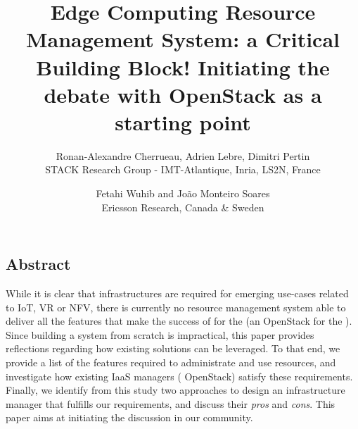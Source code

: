 \documentclass[letterpaper,twocolumn,10pt]{article}
\begin{document}
\date{}

\title{\Large \bf Edge Computing Resource Management System: a Critical
Building Block! Initiating the debate with OpenStack as a starting point}

\author{
{\rm Ronan-Alexandre Cherrueau, Adrien Lebre, Dimitri Pertin}\\
STACK Research Group - IMT-Atlantique, Inria, LS2N, France
\and
{\rm Fetahi Wuhib and  João Monteiro Soares}\\
Ericsson Research, Canada \& Sweden\\
} %

\maketitle

\thispagestyle{empty}


\subsection*{Abstract}
While it is clear that \edge infrastructures are required for emerging
use-cases related to IoT, VR or NFV, there is currently no resource management
system able to deliver all the features that make the success of
\cloudcomputing for the \edge (\eg an OpenStack for the \edge).
%
Since building a system from scratch is impractical,
this paper provides reflections regarding
how existing solutions can be leveraged.
%
To that end, we provide a list of the features required to administrate and use
\edgecomputing resources, and investigate how existing IaaS managers (\ie
OpenStack) satisfy these requirements. Finally, we identify from this study two
approaches to design an \edge infrastructure manager that fulfills our
requirements, and discuss their \emph{pros} and \emph{cons}. This paper aims at
initiating the discussion in our community. 

\end{document}
